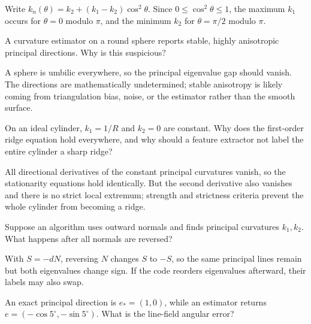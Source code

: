 \begin{solution}
Write \(k_n(\theta)=k_2+(k_1-k_2)\cos^2\theta\).  Since \(0\le\cos^2\theta\le1\), the maximum \(k_1\) occurs for \(\theta=0\) modulo \(\pi\), and the minimum \(k_2\) for \(\theta=\pi/2\) modulo \(\pi\).
\end{solution}

\begin{problem}\label{prob:vii42-02}
A curvature estimator on a round sphere reports stable, highly anisotropic principal directions.  Why is this suspicious?
\end{problem}

\begin{solution}
A sphere is umbilic everywhere, so the principal eigenvalue gap should vanish.  The directions are mathematically undetermined; stable anisotropy is likely coming from triangulation bias, noise, or the estimator rather than the smooth surface.
\end{solution}

\begin{problem}\label{prob:vii42-03}
On an ideal cylinder, \(k_1=1/R\) and \(k_2=0\) are constant.  Why does the first-order ridge equation hold everywhere, and why should a feature extractor not label the entire cylinder a sharp ridge?
\end{problem}

\begin{solution}
All directional derivatives of the constant principal curvatures vanish, so the stationarity equations hold identically.  But the second derivative also vanishes and there is no strict local extremum; strength and strictness criteria prevent the whole cylinder from becoming a ridge.
\end{solution}

\begin{problem}\label{prob:vii42-04}
Suppose an algorithm uses outward normals and finds principal curvatures \(k_1,k_2\).  What happens after all normals are reversed?
\end{problem}

\begin{solution}
With \(S=-dN\), reversing \(N\) changes \(S\) to \(-S\), so the same principal lines remain but both eigenvalues change sign.  If the code reorders eigenvalues afterward, their labels may also swap.
\end{solution}

\begin{problem}\label{prob:vii42-05}
An exact principal direction is \(e_*=(1,0)\), while an estimator returns \(e=(-\cos5^\circ,-\sin5^\circ)\).  What is the line-field angular error?
\end{problem}

